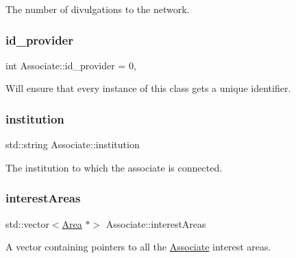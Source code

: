 The number of divulgations to the network. 

\mbox{\label{classAssociate_a9fcd0a229b70369a3f6beaf7a02fe58f}} 
\subsubsection{\texorpdfstring{id\+\_\+provider}{id\_provider}}
{\footnotesize\ttfamily int Associate\+::id\+\_\+provider = 0\hspace{0.3cm}{\ttfamily [static]}, {\ttfamily [private]}}



Will ensure that every instance of this class gets a unique identifier. 

\mbox{\label{classAssociate_a25b82eab07e159a91ebdc64fa4d656ab}} 
\subsubsection{\texorpdfstring{institution}{institution}}
{\footnotesize\ttfamily std\+::string Associate\+::institution\hspace{0.3cm}{\ttfamily [private]}}



The institution to which the associate is connected. 

\mbox{\label{classAssociate_aa4083f0fff7ce7d580f7e2df8f9dbaf2}} 
\subsubsection{\texorpdfstring{interest\+Areas}{interestAreas}}
{\footnotesize\ttfamily std\+::vector$<$\mbox{\hyperlink{classArea}{Area}} $\ast$$>$ Associate\+::interest\+Areas\hspace{0.3cm}{\ttfamily [private]}}



A vector containing pointers to all the \mbox{\hyperlink{classAssociate}{Associate}} interest areas. 

\mbox{\label{classAssociate_ad52875abacf1836cd879b7dffb88d589}} 
